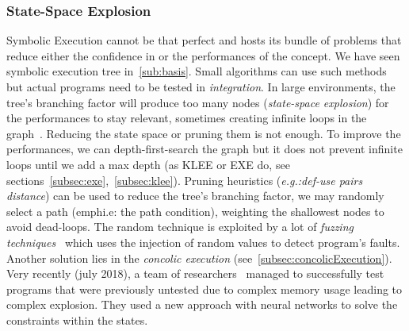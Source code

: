 \documentclass[11pt]{IEEEtran}
\begin{document}
      \subsubsection{State-Space Explosion}
        \label{subsec:state-space-explosion}
        Symbolic Execution cannot be that perfect and hosts its bundle of problems that reduce either the confidence in or the performances of the concept. We have seen symbolic execution tree in~\ref{sub:basis}. Small algorithms can use such methods but actual programs need to be tested in \emph{integration}. In large environments, the tree's branching factor will produce too many nodes (\emph{state-space explosion}) for the performances to stay relevant, sometimes creating infinite loops in the graph~\cite{forwardSymbolicExecution}. Reducing the state space or pruning them is not enough. To improve the performances, we can depth-first-search the graph but it does not prevent infinite loops until we add a max depth (as KLEE or EXE do, see sections~\ref{subsec:exe},~\ref{subsec:klee}).
        Pruning heuristics (\emph{e.g.:def-use pairs distance}) can be used to reduce the tree's branching factor, we may randomly select a path (emph{i.e: the path condition}), weighting the shallowest nodes to avoid dead-loops. The random technique is exploited by a lot of \emph{fuzzing techniques}~\cite{CHEN2018118} which uses the injection of random values to detect program's faults. Another solution lies in the \emph{concolic execution} (see~\ref{subsec:concolicExecution}). Very recently (july 2018), a team of researchers~\cite{neurosymbolicexecution} managed to successfully test programs that were previously untested due to complex memory usage leading to complex explosion. They used a new approach with neural networks to solve the constraints within the states.
\end{document}
